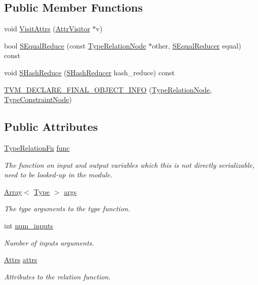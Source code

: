 \subsection*{Public Member Functions}
\begin{DoxyCompactItemize}
\item 
void \hyperlink{classtvm_1_1TypeRelationNode_af6546e6843f43431258a68f2ac933146}{Visit\+Attrs} (\hyperlink{classtvm_1_1AttrVisitor}{Attr\+Visitor} $\ast$v)
\item 
bool \hyperlink{classtvm_1_1TypeRelationNode_a9aa8c552275b3a65fffdef92e9f655cd}{S\+Equal\+Reduce} (const \hyperlink{classtvm_1_1TypeRelationNode}{Type\+Relation\+Node} $\ast$other, \hyperlink{classtvm_1_1SEqualReducer}{S\+Equal\+Reducer} equal) const 
\item 
void \hyperlink{classtvm_1_1TypeRelationNode_a782c2d917afb155569b9e074101cebac}{S\+Hash\+Reduce} (\hyperlink{classtvm_1_1SHashReducer}{S\+Hash\+Reducer} hash\+\_\+reduce) const 
\item 
\hyperlink{classtvm_1_1TypeRelationNode_a3362daa2e1b72c6ee60207fa493532f2}{T\+V\+M\+\_\+\+D\+E\+C\+L\+A\+R\+E\+\_\+\+F\+I\+N\+A\+L\+\_\+\+O\+B\+J\+E\+C\+T\+\_\+\+I\+N\+FO} (\hyperlink{classtvm_1_1TypeRelationNode}{Type\+Relation\+Node}, \hyperlink{classtvm_1_1TypeConstraintNode}{Type\+Constraint\+Node})
\end{DoxyCompactItemize}
\subsection*{Public Attributes}
\begin{DoxyCompactItemize}
\item 
\hyperlink{namespacetvm_a72dcba4493adfcd8908663898ece3514}{Type\+Relation\+Fn} \hyperlink{classtvm_1_1TypeRelationNode_a2f243e89c5f192eb8c006313fa0c7c5a}{func}
\begin{DoxyCompactList}\small\item\em The function on input and output variables which this is not directly serializable, need to be looked-\/up in the module. \end{DoxyCompactList}\item 
\hyperlink{classtvm_1_1Array}{Array}$<$ \hyperlink{classtvm_1_1Type}{Type} $>$ \hyperlink{classtvm_1_1TypeRelationNode_a4ae12e1df74b0b93404db6a762ef9f3f}{args}
\begin{DoxyCompactList}\small\item\em The type arguments to the type function. \end{DoxyCompactList}\item 
int \hyperlink{classtvm_1_1TypeRelationNode_aacb622dd257962ccb4ddfca4c89e09b4}{num\+\_\+inputs}
\begin{DoxyCompactList}\small\item\em Number of inputs arguments. \end{DoxyCompactList}\item 
\hyperlink{classtvm_1_1Attrs}{Attrs} \hyperlink{classtvm_1_1TypeRelationNode_a4398ffaf2402c479157ca5cbf05c5a7e}{attrs}
\begin{DoxyCompactList}\small\item\em Attributes to the relation function. \end{DoxyCompactList}\end{DoxyCompactItemize}
